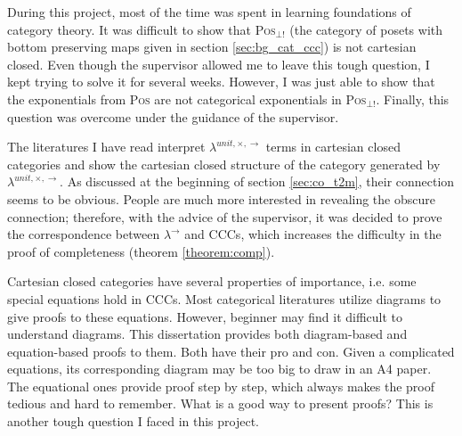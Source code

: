 During this project, most of the time was spent in learning foundations of category theory. It was difficult to show that \textsc{Pos}$_{\bot !}$ (the category of posets with bottom preserving maps given in section \ref{sec:bg_cat_ccc}) is not cartesian closed. Even though the supervisor allowed me to leave this tough question, I kept trying to solve it for several weeks. However, I was just able to show that the exponentials from \textsc{Pos} are not categorical exponentials in \textsc{Pos}$_{\bot !}$. Finally, this question was overcome under the guidance of the supervisor.

The literatures \cite{AL91,BW95,LS86,Mit96} I have read interpret $ \lambda^{unit,\times,\to} $ terms in cartesian closed categories and show the cartesian closed structure of the category generated by $ \lambda^{unit,\times,\to} $. As discussed at the beginning of section \ref{sec:co_t2m}, their connection seems to be obvious. People are much more interested in revealing the obscure connection; therefore, with the advice of the supervisor, it was decided to prove the correspondence between $ \lambda^{\to} $ and CCCs, which increases the difficulty in the proof of completeness (theorem \ref{theorem:comp}).

Cartesian closed categories have several properties of importance, i.e. some special equations hold in CCCs. Most categorical literatures utilize diagrams to give proofs to these equations. However, beginner may find it difficult to understand diagrams. This dissertation provides both diagram-based and equation-based proofs to them. Both have their pro and con. Given a complicated equations, its corresponding diagram may be too big to draw in an A4 paper. The equational ones provide proof step by step, which always makes the proof tedious and hard to remember. What is a good way to present proofs? This is another tough question I faced in this project.